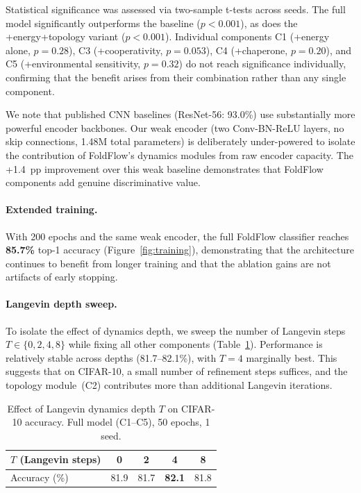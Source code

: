 \documentclass[10pt]{article}
\begin{document}
Statistical significance was assessed via two-sample t-tests across seeds. The full model significantly outperforms the baseline ($p < 0.001$), as does the +energy+topology variant ($p < 0.001$). Individual components C1 (+energy alone, $p = 0.28$), C3 (+cooperativity, $p = 0.053$), C4 (+chaperone, $p = 0.20$), and C5 (+environmental sensitivity, $p = 0.32$) do not reach significance individually, confirming that the benefit arises from their combination rather than any single component.

We note that published CNN baselines (ResNet-56: 93.0\%) use
substantially more powerful encoder backbones.  Our weak encoder
(two Conv-BN-ReLU layers, no skip connections, 1.48M total parameters)
is deliberately under-powered to isolate the contribution of FoldFlow's
dynamics modules from raw encoder capacity.  The +1.4~pp improvement
over this weak baseline demonstrates that FoldFlow components add genuine
discriminative value.

\paragraph{Extended training.}
With 200 epochs and the same weak encoder, the full FoldFlow classifier
reaches \textbf{85.7\%} top-1 accuracy (Figure~\ref{fig:training}),
demonstrating that the architecture continues to benefit from longer
training and that the ablation gains are not artifacts of early stopping.

\paragraph{Langevin depth sweep.}
To isolate the effect of dynamics depth, we sweep the number of Langevin
steps $T \in \{0, 2, 4, 8\}$ while fixing all other components
(Table~\ref{tab:step_sweep}).  Performance is relatively stable across
depths (81.7--82.1\%), with $T{=}4$ marginally best.  This suggests that
on CIFAR-10, a small number of refinement steps suffices, and the
topology module~(C2) contributes more than additional Langevin
iterations.

\begin{table}[t]
\centering
\caption{Effect of Langevin dynamics depth $T$ on CIFAR-10 accuracy.
  Full model (C1--C5), 50 epochs, 1 seed.}
\label{tab:step_sweep}
\small
\begin{tabular}{@{}lcccc@{}}
\toprule
$T$ (Langevin steps)  & 0 & 2 & 4 & 8 \\
\midrule
Accuracy (\%) & 81.9 & 81.7 & \textbf{82.1} & 81.8 \\
\bottomrule
\end{tabular}
\end{table}
\end{document}
